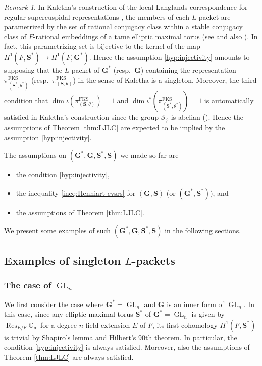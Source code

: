 \documentclass{amsart}
\newcommand{\FKS}{\mathrm{FKS}}
\newcommand{\Gm}{\mathbb{G}_{\mathrm{m}}}
\newcommand{\bfG}{\mathbf{G}}
\newcommand{\bfS}{\mathbf{S}}
\DeclareMathOperator{\Res}{Res}
\DeclareMathOperator{\GL}{GL}
\theoremstyle{plain}
\theoremstyle{definition}
\theoremstyle{remark}
\newtheorem{rem}[thm]{Remark}
\theoremstyle{theorem}
\begin{document}
\begin{rem}
In Kaletha's construction of the local Langlands correspondence for regular supercuspidal representations \cite{Kal19}, the members of each $L$-packet are parametrized by the set of rational conjugacy class within a stable conjugacy class of $F$-rational embeddings of a tame elliptic maximal torus (see \cite[Section 5.3]{Kal19} and also \cite[Section 8]{CO21}).
In fact, this parametrizing set is bijective to the kernel of the map $H^{1}(F,\bfS^{\ast})\rightarrow H^{1}(F,\bfG^{\ast})$.
Hence the assumption \eqref{hyp:injectivity} amounts to supposing that the $L$-packet of $\bfG^{\ast}$ (resp.\ $\bfG$) containing the representation $\pi^{\FKS}_{(\bfS^{\ast},\theta^{\ast})}$ (resp.\ $\pi^{\FKS}_{(\bfS,\theta)}$) in the sense of Kaletha is a singleton.
Moreover, the third condition that $\dim\iota(\pi^{\FKS}_{(\bfS,\theta)})=1$ and $\dim\iota^{\ast}(\pi^{\FKS}_{(\bfS^{\ast},\theta^{\ast})})=1$ is automatically satisfied in Kaletha's construction since the group $\mathcal{S}_{\phi}$ is abelian (\cite[Section 5.3]{Kal19}).
Hence the assumptions of Theorem \ref{thm:LJLC} are expected to be implied by the assumption \eqref{hyp:injectivity}.
\end{rem}

The assumptions on $(\bfG^{\ast},\bfG,\bfS^{\ast},\bfS)$ we made so far are 
\begin{itemize}
\item
the condition \eqref{hyp:injectivity}, 
\item
the inequality \eqref{ineq:Henniart-evsrs} for $(\bfG,\bfS)$ (or $(\bfG^{\ast},\bfS^{\ast})$), and 
\item
the assumptions of Theorem \ref{thm:LJLC}.
\end{itemize}
We present some examples of such $(\bfG^{\ast},\bfG,\bfS^{\ast},\bfS)$ in the following sections.


\subsection{Examples of singleton $L$-packets}

\subsubsection{The case of $\GL_{n}$}
We first consider the case where $\bfG^{\ast}=\GL_{n}$ and $\bfG$ is an inner form of $\GL_{n}$.
In this case, since any elliptic maximal torus $\bfS^{\ast}$ of $\bfG^{\ast}=\GL_{n}$ is given by $\Res_{E/F}\Gm$ for a degree $n$ field extension $E$ of $F$, its first cohomology $H^{1}(F,\bfS^{\ast})$ is trivial by Shapiro's lemma and Hilbert's 90th theorem.
In particular, the condition \eqref{hyp:injectivity} is always satisfied.
Moreover, also the assumptions of Theorem \ref{thm:LJLC} are always satisfied.
\end{document}
